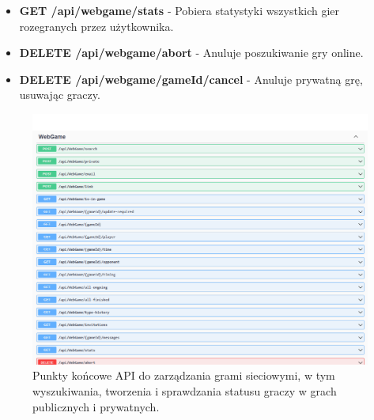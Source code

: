 \documentclass[12pt,a4paper]{article}
\begin{document}
\begin{itemize}
\begin{itemize}
        \item \textbf{GET /api/webgame/stats} - Pobiera statystyki wszystkich gier rozegranych przez użytkownika. 
        \item \textbf{DELETE /api/webgame/abort} - Anuluje poszukiwanie gry online. 
        \item \textbf{DELETE /api/webgame/{gameId}/cancel} - Anuluje prywatną grę, usuwając graczy. 
    \end{itemize}
    \begin{figure}[h!]
        \centering
        \includegraphics[width=1\textwidth]{zdj/webgame_controller.png}
        \caption{Punkty końcowe API do zarządzania grami sieciowymi, w tym wyszukiwania, tworzenia i sprawdzania statusu graczy w grach publicznych i prywatnych.}
    \end{figure}

    \newpage


\end{itemize}
\end{document}
